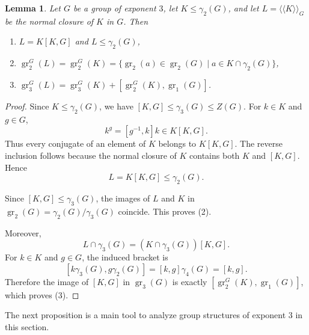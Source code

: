 \documentclass[11pt,reqno]{article}
\newtheorem{lemma}[theorem]{Lemma}
\theoremstyle{definition}
\theoremstyle{remark}
\DeclareMathOperator{\gr}{gr}
\newcommand{\llangle}{\langle\!\langle}
\newcommand{\rrangle}{\rangle\!\rangle}
\begin{document}
\begin{lemma}\label{lemma:gr of normal closure}
    Let $G$ be a group of exponent $3$, let $K\leq\gamma_2(G)$, and let
    $L=\llangle K\rrangle_G$ be the normal closure of $K$ in $G$.
    Then
    \begin{enumerate}
        \item $L=K[K,G]$ and $L\leq \gamma_2(G)$,
        \item $\gr_2^G(L)=\gr_2^G(K)=\{\gr_2(a)\in \gr_2(G)\mid a\in K\cap \gamma_2(G)\}$,
        \item $\gr_3^G(L)=\gr_3^G(K)+[\gr_2^G(K),\gr_1(G)]$.
    \end{enumerate}
\end{lemma}

\begin{proof}
    Since $K\leq\gamma_2(G)$, we have
    $[K,G]\leq\gamma_3(G)\leq Z(G)$.  For $k\in K$ and $g\in G$,
    \[
    k^g=[g^{-1},k]k\in K[K,G].
    \]
    Thus every conjugate of an element of $K$ belongs to $K[K,G]$.  The
    reverse inclusion follows because the normal closure of $K$ contains both
    $K$ and $[K,G]$.  Hence
    \[
    L=K[K,G]\leq\gamma_2(G).
    \]

    Since $[K,G]\leq\gamma_3(G)$, the images of $L$ and $K$ in
    $\gr_2(G)=\gamma_2(G)/\gamma_3(G)$ coincide.  This proves (2).

    Moreover,
    \[
    L\cap\gamma_3(G)=(K\cap\gamma_3(G))[K,G].
    \]
    For $k\in K$ and $g\in G$, the induced bracket is
    \[
    [k\gamma_3(G),g\gamma_2(G)]
    =[k,g]\gamma_4(G)=[k,g].
    \]
    Therefore the image of $[K,G]$ in $\gr_3(G)$ is exactly
    $[\gr_2^G(K),\gr_1(G)]$, which proves (3).
\end{proof}
The next proposition is a main tool to analyze group structures of exponent $3$ in this section.
\end{document}
